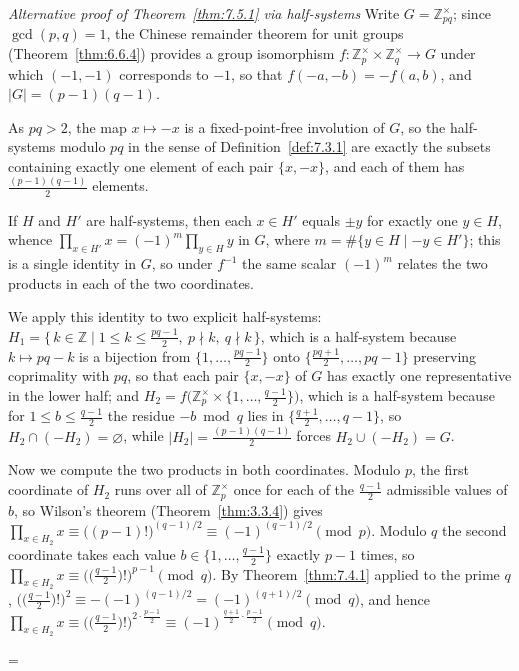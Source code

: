 \documentclass[11pt]{article}
\makeatletter
\theoremstyle{ntstyle}
\let\nt@closedisplay\]
\def\nt@guardedclose{\@ifnextchar\par{\nt@closeafterpar}{\@ifnextchar\end{\postdisplaypenalty\@M\nt@closedisplay}{\nt@closedisplay}}}
\def\nt@closeafterpar\par{\@ifnextchar\par{\nt@closeafterpar}{\@ifnextchar\end{\postdisplaypenalty\@M\nt@closedisplay\par}{\nt@closedisplay\par}}}
\renewenvironment{proof}[1][\proofname]{\par
  \pushQED{\qed}\normalfont\topsep\medskipamount\edef\nt@afterproof{\@endparpenalty=\the\@endparpenalty\relax}\@beginparpenalty\@M\@endparpenalty\@M\let\]\nt@guardedclose\trivlist\item[]\textit{#1\@addpunct{.}} \ignorespaces}{\ifvmode\addpenalty\@M\fi\popQED\nt@afterproof\endtrivlist\@endpefalse}
\newenvironment{altproof}[1][\proofname]{\begin{proof}[#1]\renewcommand{\qedsymbol}{}}{\end{proof}}
\newcommand{\ZmodUnits}[1]{\mathbb{Z}_{#1}^{\times}}
\makeatother
\begin{document}
\begin{altproof}[Alternative proof of Theorem~\ref{thm:7.5.1} via half-systems] Write $G = \ZmodUnits{pq}$; since $\gcd(p, q)
		= 1$, the Chinese remainder theorem for unit groups (Theorem~\ref{thm:6.6.4}) provides a group
	isomorphism $f : \ZmodUnits{p} \times \ZmodUnits{q}
		\to G$ under which $(-1, -1)$ corresponds to $-1$, so that $f(-a, -b)
		= -f(a, b)$, and $|G| = (p-1)(q-1)$.

	As $pq > 2$, the map $x \mapsto
		-x$ is a fixed-point-free involution of $G$, so the half-systems modulo
	$pq$ in the sense of Definition~\ref{def:7.3.1} are exactly the subsets containing
	exactly one element of each pair $\{x, -x\}$, and each of them has
	$\tfrac{(p-1)(q-1)}{2}$ elements.

	If $H$ and $H'$
	are half-systems, then each $x \in H'$ equals $\pm y$ for exactly one
	$y \in H$, whence $\prod_{x \in H'} x = (-1)^{m} \prod_{y \in H} y$ in
	$G$, where $m = \#\{y \in H \mid -y \in H'\}$; this is a single
	identity in $G$, so under $f^{-1}$ the same scalar $(-1)^{m}$ relates
	the two products in each of the two coordinates.

	We apply this identity to two explicit
	half-systems: $H_1 = \{\, k \in \mathbb{Z} \mid 1 \le k \le
		\tfrac{pq-1}{2},\ p \nmid k,\ q \nmid k \,\}$, which is a half-system
	because $k \mapsto pq - k$ is a bijection from $\{1, \ldots,
		\tfrac{pq-1}{2}\}$ onto $\{\tfrac{pq+1}{2}, \ldots, pq-1\}$
	preserving coprimality with $pq$, so that each pair $\{x, -x\}$ of $G$
	has exactly one representative in the lower half; and $H_2 =
		f\big(\ZmodUnits{p} \times \{1, \ldots,
		\tfrac{q-1}{2}\}\big)$, which is a half-system because for $1 \le b
		\le \tfrac{q-1}{2}$ the residue $-b \bmod q$ lies in
	$\{\tfrac{q+1}{2}, \ldots, q-1\}$, so $H_2 \cap (-H_2) = \varnothing$,
	while $|H_2| = \tfrac{(p-1)(q-1)}{2}$ forces $H_2 \cup (-H_2) = G$.

	Now we compute the two products in both coordinates. Modulo $p$, the
	first coordinate of $H_2$ runs over all of $\ZmodUnits{p}$
	once for each of the $\tfrac{q-1}{2}$ admissible values of $b$, so
	Wilson's theorem (Theorem~\ref{thm:3.3.4}) gives $\prod_{x \in H_2} x \equiv
		\big((p-1)!\big)^{(q-1)/2} \equiv (-1)^{(q-1)/2} \pmod{p}$. Modulo $q$
	the second coordinate takes each value $b \in \{1, \ldots,
		\tfrac{q-1}{2}\}$ exactly $p-1$ times, so $\prod_{x \in H_2} x \equiv
		\big(\big(\tfrac{q-1}{2}\big)!\big)^{p-1} \pmod{q}$. By
	Theorem~\ref{thm:7.4.1} applied to the prime $q$,
	$\big(\big(\tfrac{q-1}{2}\big)!\big)^{2} \equiv -(-1)^{(q-1)/2} = (-1)^{(q+1)/2}
		\pmod{q}$, and hence $\prod_{x \in H_2} x \equiv
		\big(\big(\tfrac{q-1}{2}\big)!\big)^{2 \cdot \frac{p-1}{2}} \equiv
		(-1)^{\frac{q+1}{2}\cdot\frac{p-1}{2}} \pmod{q}$.


\end{altproof}
\end{document}
